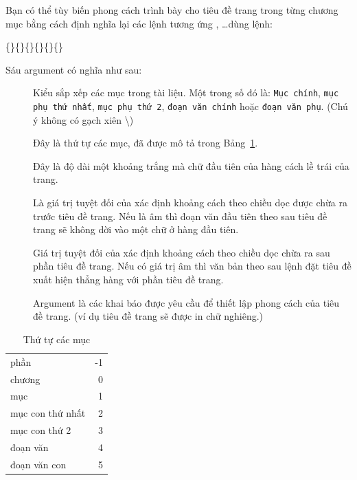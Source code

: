 \documentclass[a4paper]{report}
\begin{document}
Bạn có thể tùy biến phong cách trình bày cho tiêu đề trang trong từng chương mục bằng cách định nghĩa lại các lệnh tương ứng 
,
 \ldots  dùng lệnh:
\begin{definition}
\{\}\{\}\{\}\{\}\{\}\{\}
\end{definition}%
\noindent Sáu argument  có nghĩa như sau:
\begin{description}
\item[\normalfont{}]
Kiểu sắp xếp các mục trong tài liệu.  Một trong số đó là: \texttt{Mục chính},
\texttt{mục phụ thứ nhất}, \texttt{mục phụ thứ 2}, \texttt{đoạn văn chính} hoặc \texttt{đoạn văn phụ}.
(Chú ý không có gạch xiên \backslash)

\item[\normalfont{}]
Đây là thứ tự các mục, đã được mô tả trong Bảng~\ref{tab:secnum}.

\item[\normalfont{}]
Đây là độ dài một khoảng trắng mà chữ đầu tiên của hàng cách lề trái của trang.

\item[\normalfont{}]
Là giá trị tuyệt đối của   xác định khoảng cách theo chiều dọc được chừa ra trước tiêu đề trang. Nếu  là âm thì đoạn văn đầu tiên theo sau tiêu đề trang sẽ không dời vào một chữ ở hàng đầu tiên.

\item[\normalfont{}]
 Giá trị tuyệt đối của   xác định khoảng cách theo chiều dọc chừa ra sau phần tiêu đề trang. Nếu   có giá trị âm thì văn bản theo sau lệnh đặt tiêu đề xuất hiện thẳng hàng với phần tiêu đề trang.

\item[\normalfont{}]
Argument   là các khai báo được yêu cầu để thiết  lập phong cách của tiêu đề trang. (ví dụ
 tiêu đề trang sẽ được in chữ nghiêng.) 

\end{description}

\begin{table}[hbt]
\caption{Thứ tự các mục}
\label{tab:secnum}
\begin{center}
\begin{tabular}{lr}
phần & -1\\
chương & 0\\
mục & 1\\
mục con thứ nhất & 2\\
mục con thứ 2 & 3\\
đoạn văn & 4\\
đoạn văn con & 5
\end{tabular}
\end{center}
\end{table}
\end{document}
